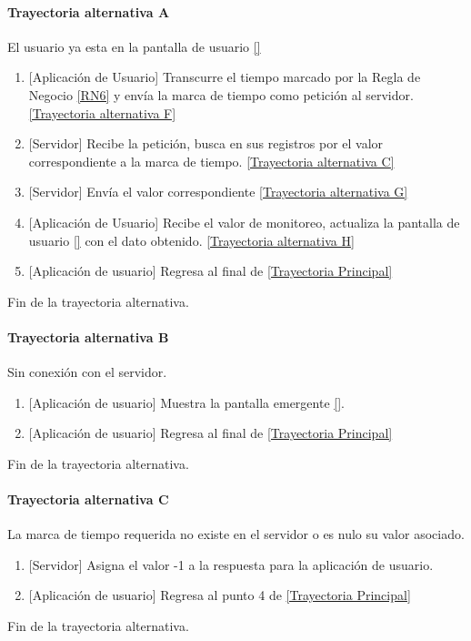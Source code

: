 \paragraph{Trayectoria alternativa A} \label{SUB-M-CU5:TA}
	El usuario ya esta en la pantalla de usuario \ref{} 
	\begin{enumerate}[label=A\arabic*.]
		\item {[Aplicación de Usuario]} Transcurre el tiempo marcado por la Regla de Negocio \ref{RN6} y envía la marca de tiempo como petición al servidor. \hyperref[SUB-M-CU5:TF]{[Trayectoria alternativa F]} 
		\item {[Servidor]} Recibe la petición, busca en sus registros por el valor correspondiente a la marca de tiempo. \hyperref[SUB-M-CU5:TC]{[Trayectoria alternativa C]} 
		\item  {[Servidor]} Envía el valor correspondiente \hyperref[SUB-M-CU5:TG]{[Trayectoria alternativa G]}
        \item {[Aplicación de Usuario]} Recibe el valor de monitoreo, actualiza la pantalla de usuario \ref{} con el dato obtenido.
        \hyperref[SUB-M-CU5:TH]{[Trayectoria alternativa H]}
        \item {[Aplicación de usuario]} Regresa al final de \hyperref[SUB-M-CU5:TP]{[Trayectoria Principal]}
	\end{enumerate}
	Fin de la trayectoria alternativa.

\paragraph{Trayectoria alternativa B} \label{SUB-M-CU5:TB}
	Sin conexión con el servidor.
	\begin{enumerate}[label=B\arabic*.]
		\item {[Aplicación de usuario]} Muestra la pantalla emergente \ref{}.
		\item {[Aplicación de usuario]} Regresa al final de \hyperref[SUB-M-CU5:TP]{[Trayectoria Principal]}
	\end{enumerate}
	Fin de la trayectoria alternativa.

\paragraph{Trayectoria alternativa C} \label{SUB-M-CU5:TC}
	La marca de tiempo requerida no existe en el servidor o es nulo su valor asociado.
	\begin{enumerate}[label=C\arabic*.]
		\item {[Servidor]} Asigna el valor -1 a la respuesta para la aplicación de usuario.
		\item {[Aplicación de usuario]} Regresa al punto 4 de \hyperref[SUB-M-CU5:TP]{[Trayectoria Principal]}
	\end{enumerate}
	Fin de la trayectoria alternativa.

